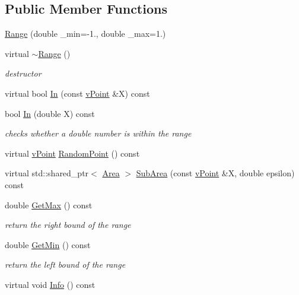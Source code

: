 \subsection*{Public Member Functions}
\begin{DoxyCompactItemize}
\item 
\hyperlink{class_range_aad92f98f8860648f7d6756f0c07d66ba}{Range} (double \+\_\+min=-\/1., double \+\_\+max=1.)
\item 
\mbox{\label{class_range_a55756d815e35f6a003536342cf2e694b}} 
virtual \hyperlink{class_range_a55756d815e35f6a003536342cf2e694b}{$\sim$\+Range} ()
\begin{DoxyCompactList}\small\item\em destructor \end{DoxyCompactList}\item 
virtual bool \hyperlink{class_range_abaec0363220c4fbedaca148a4790bc9e}{In} (const \hyperlink{classv_point}{v\+Point} \&X) const
\item 
bool \hyperlink{class_range_a2d76a15c78b08d8c14dd076b630ee1eb}{In} (double X) const
\begin{DoxyCompactList}\small\item\em checks whether a double number is within the range \end{DoxyCompactList}\item 
virtual \hyperlink{classv_point}{v\+Point} \hyperlink{class_range_a71795faae3f99507eb999e7df0c248da}{Random\+Point} () const
\item 
virtual std\+::shared\+\_\+ptr$<$ \hyperlink{class_area}{Area} $>$ \hyperlink{class_range_ab75514ad9a6e950a15d901020a65119a}{Sub\+Area} (const \hyperlink{classv_point}{v\+Point} \&X, double epsilon) const
\item 
\mbox{\label{class_range_afd09ccc714abb96009efd345ee2b8f91}} 
double \hyperlink{class_range_afd09ccc714abb96009efd345ee2b8f91}{Get\+Max} () const
\begin{DoxyCompactList}\small\item\em return the right bound of the range \end{DoxyCompactList}\item 
\mbox{\label{class_range_ad1a4ac0512e07c9987c9b78297e9ae4e}} 
double \hyperlink{class_range_ad1a4ac0512e07c9987c9b78297e9ae4e}{Get\+Min} () const
\begin{DoxyCompactList}\small\item\em return the left bound of the range \end{DoxyCompactList}\item 
virtual void \hyperlink{class_range_adcbfaa8ea3d2e6da005573fd8146e952}{Info} () const
\end{DoxyCompactItemize}
